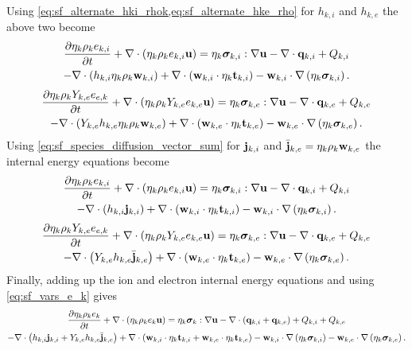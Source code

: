 \documentclass[a4paper,11pt]{report}
\begin{document}
Using \cref{eq:sf_alternate_hki_rhok,eq:sf_alternate_hke_rho} for $h_{k,i}$ and $h_{k,e}$ the above two become
\begin{multline*}
    \frac{\partial \eta_k \rho_k e_{k,i}}{\partial t} + \nabla \cdot \left( \eta_k \rho_k e_{k,i} \mathbf{u} \right) = \eta_k \bm \sigma_{k,i} : \nabla \mathbf{u} - \nabla \cdot \mathbf{q}_{k,i} + Q_{k,i} \\
    - \nabla \cdot \left( h_{k,i} \eta_k \rho_k \mathbf{w}_{k,i} \right) + \nabla \cdot \left( \mathbf{w}_{k,i} \cdot \eta_k \mathbf{t}_{k,i} \right) - \mathbf{w}_{k,i} \cdot \nabla \left( \eta_k \bm \sigma_{k,i} \right).
\end{multline*}
\begin{multline*}
    \frac{\partial \eta_k \rho_k Y_{k,e} e_{e,k}}{\partial t} + \nabla \cdot \left( \eta_k \rho_k Y_{k,e} e_{k,e} \mathbf{u} \right) = \eta_k \bm \sigma_{k,e} : \nabla \mathbf{u} - \nabla \cdot \mathbf{q}_{k,e} + Q_{k,e} \\
    - \nabla \cdot \left( Y_{k,e} h_{k,e} \eta_k \rho_k \mathbf{w}_{k,e} \right) + \nabla \cdot \left( \mathbf{w}_{k,e} \cdot \eta_k \mathbf{t}_{k,e} \right) - \mathbf{w}_{k,e} \cdot \nabla \left( \eta_k \bm \sigma_{k,e} \right).
\end{multline*}
Using \cref{eq:sf_species_diffusion_vector_sum} for $\mathbf{j}_{k,i}$ and $\bar{\mathbf{j}}_{k,e} = \eta_k \rho_k \mathbf{w}_{k,e}$ the internal energy equations become
\begin{multline*}
    \frac{\partial \eta_k \rho_k e_{k,i}}{\partial t} + \nabla \cdot \left( \eta_k \rho_k e_{k,i} \mathbf{u} \right) = \eta_k \bm \sigma_{k,i} : \nabla \mathbf{u} - \nabla \cdot \mathbf{q}_{k,i} + Q_{k,i} \\
    - \nabla \cdot \left( h_{k,i} \mathbf{j}_{k,i} \right) + \nabla \cdot \left( \mathbf{w}_{k,i} \cdot \eta_k \mathbf{t}_{k,i} \right) - \mathbf{w}_{k,i} \cdot \nabla \left( \eta_k \bm \sigma_{k,i} \right).
\end{multline*}
\begin{multline*}
    \frac{\partial \eta_k \rho_k Y_{k,e} e_{e,k}}{\partial t} + \nabla \cdot \left( \eta_k \rho_k Y_{k,e} e_{k,e} \mathbf{u} \right) = \eta_k \bm \sigma_{k,e} : \nabla \mathbf{u} - \nabla \cdot \mathbf{q}_{k,e} + Q_{k,e} \\
    - \nabla \cdot \left( Y_{k,e} h_{k,e} \bar{\mathbf{j}}_{k,e} \right) + \nabla \cdot \left( \mathbf{w}_{k,e} \cdot \eta_k \mathbf{t}_{k,e} \right) - \mathbf{w}_{k,e} \cdot \nabla \left( \eta_k \bm \sigma_{k,e} \right).
\end{multline*}
Finally, adding up the ion and electron internal energy equations and using \cref{eq:sf_vars_e_k} gives
\begin{multline}
    \label{eq:sf_alternate_e_k}
    \frac{\partial \eta_k \rho_k e_k}{\partial t} + \nabla \cdot \left( \eta_k \rho_k e_k \mathbf{u} \right) = \eta_k \bm \sigma_k: \nabla \mathbf{u} - \nabla \cdot \left( \mathbf{q}_{k,i} + \mathbf{q}_{k,e} \right) + Q_{k,i} + Q_{k,e} \\
    - \nabla \cdot \left( h_{k,i} \mathbf{j}_{k,i} + Y_{k,e} h_{k,e} \bar{\mathbf{j}}_{k,e} \right) + \nabla \cdot \left( \mathbf{w}_{k,i} \cdot \eta_k \mathbf{t}_{k,i} + \mathbf{w}_{k,e} \cdot \eta_k \mathbf{t}_{k,e} \right) - \mathbf{w}_{k,i} \cdot \nabla \left( \eta_k \bm \sigma_{k,i} \right) - \mathbf{w}_{k,e} \cdot \nabla \left( \eta_k \bm \sigma_{k,e} \right) .
\end{multline}
\end{document}
